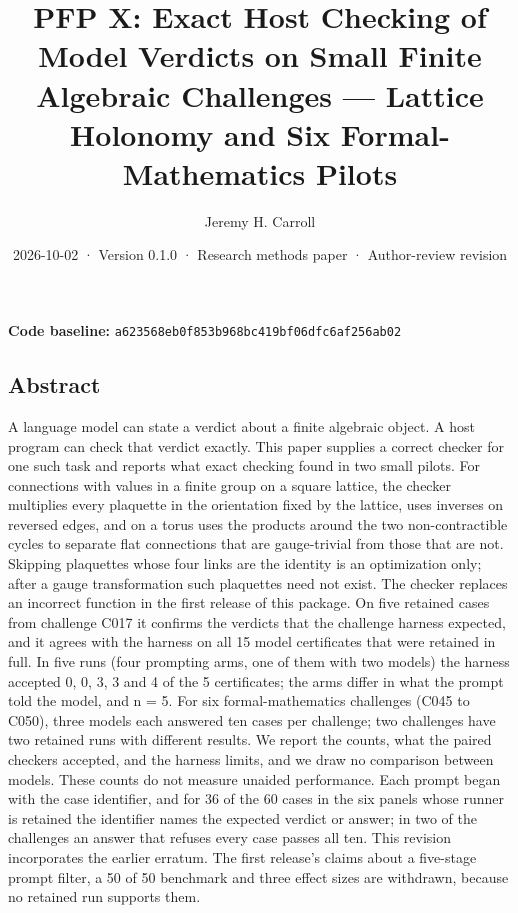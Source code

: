 \documentclass[
  11pt,
]{article}
\title{PFP X: Exact Host Checking of Model Verdicts on Small Finite
Algebraic Challenges --- Lattice Holonomy and Six Formal-Mathematics
Pilots}
\author{Jeremy H. Carroll}
\date{2026-10-02 · Version 0.1.0 · Research methods paper ·
Author-review revision}
\begin{document}
\makeatletter
\begin{center}
{\LARGE \@title\par}
\vspace{0.8em}
{\normalsize \@author\par}
\vspace{0.5em}
{\small \@date\par}
\end{center}
\makeatother

\textbf{Code baseline:}
\nolinkurl{a623568eb0f853b968bc419bf06dfc6af256ab02}

\subsection{Abstract}\label{abstract}

A language model can state a verdict about a finite algebraic object. A
host program can check that verdict exactly. This paper supplies a
correct checker for one such task and reports what exact checking found
in two small pilots. For connections with values in a finite group on a
square lattice, the checker multiplies every plaquette in the
orientation fixed by the lattice, uses inverses on reversed edges, and
on a torus uses the products around the two non-contractible cycles to
separate flat connections that are gauge-trivial from those that are
not. Skipping plaquettes whose four links are the identity is an
optimization only; after a gauge transformation such plaquettes need not
exist. The checker replaces an incorrect function in the first release
of this package. On five retained cases from challenge C017 it confirms
the verdicts that the challenge harness expected, and it agrees with the
harness on all 15 model certificates that were retained in full. In five
runs (four prompting arms, one of them with two models) the harness
accepted 0, 0, 3, 3 and 4 of the 5 certificates; the arms differ in what
the prompt told the model, and n = 5. For six formal-mathematics
challenges (C045 to C050), three models each answered ten cases per
challenge; two challenges have two retained runs with different results.
We report the counts, what the paired checkers accepted, and the harness
limits, and we draw no comparison between models. These counts do not
measure unaided performance. Each prompt began with the case identifier,
and for 36 of the 60 cases in the six panels whose runner is retained
the identifier names the expected verdict or answer; in two of the
challenges an answer that refuses every case passes all ten. This
revision incorporates the earlier erratum. The first release's claims
about a five-stage prompt filter, a 50 of 50 benchmark and three effect
sizes are withdrawn, because no retained run supports them.
\end{document}
